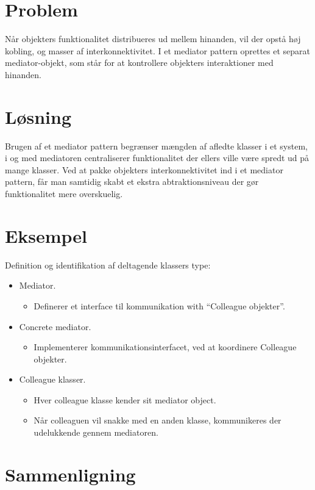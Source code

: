 \section{Problem}
Når objekters funktionalitet distribueres ud mellem hinanden, vil der opstå høj kobling, og masser af interkonnektivitet.  I et mediator pattern oprettes et separat mediator-objekt, som står for at kontrollere objekters interaktioner med hinanden. 

\section{Løsning}
Brugen af et mediator pattern begrænser mængden af afledte klasser i et system, i og med mediatoren centraliserer funktionalitet der ellers ville være spredt ud på mange klasser. Ved at pakke objekters interkonnektivitet ind i et mediator pattern, får man samtidig skabt et ekstra abtraktionsniveau der gør funktionalitet mere overskuelig.

\section{Eksempel}
Definition og identifikation af deltagende klassers type:

\begin{itemize}
	\item Mediator.
	\begin{itemize}
		\item 	Definerer et interface til kommunikation with “Colleague objekter”.
	\end{itemize}
	\item Concrete mediator.
	\begin{itemize}
		\item 	Implementerer kommunikationsinterfacet, ved at koordinere Colleague objekter.
	\end{itemize}
	\item Colleague klasser.
	\begin{itemize}
		\item Hver colleague klasse kender sit mediator object.
		\item Når colleaguen vil snakke med en anden klasse, kommunikeres der udelukkende gennem mediatoren.
	\end{itemize}
\end{itemize}

\section{Sammenligning}
